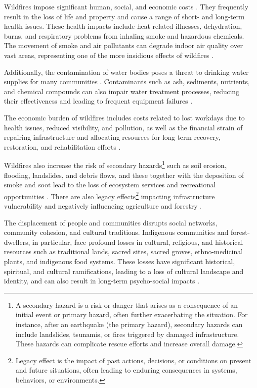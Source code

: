 \documentclass[
  12 pt,
]{Nemilov}
\begin{document}
Wildfires impose significant human, social, and economic costs \citep{bayham2022economics, paveglio2015understanding, thomas2017costs}. They frequently result in the loss of life and property and cause a range of short- and long-term health issues. These health impacts include heat-related illnesses, dehydration, burns, and respiratory problems from inhaling smoke and hazardous chemicals. The movement of smoke and air pollutants can degrade indoor air quality over vast areas, representing one of the more insidious effects of wildfires \citep{liang2021wildfire}.

Additionally, the contamination of water bodies poses a threat to drinking water supplies for many communities \citep{robinne2018spatial}. Contaminants such as ash, sediments, nutrients, and chemical compounds can also impair water treatment processes, reducing their effectiveness and leading to frequent equipment failures \citep{chen2020low, hohner2019wildfires}.

The economic burden of wildfires includes costs related to lost workdays due to health issues, reduced visibility, and pollution, as well as the financial strain of repairing infrastructure and allocating resources for long-term recovery, restoration, and rehabilitation efforts \citep{kim2019wildfire, mcconnell2021effects}.

Wildfires also increase the risk of secondary hazards\footnote{A secondary hazard is a risk or danger that arises as a consequence of an initial event or primary hazard, often further exacerbating the situation. For instance, after an earthquake (the primary hazard), secondary hazards can include landslides, tsunamis, or fires triggered by damaged infrastructure. These hazards can complicate rescue efforts and increase overall damage.} such as soil erosion, flooding, landslides, and debris flows, and these together with the deposition of smoke and soot lead to the loss of ecosystem services and recreational opportunities \citep{gellman2022wildfire}. There are also legacy effects\footnote{Legacy effect is the impact of past actions, decisions, or conditions on present and future situations, often leading to enduring consequences in systems, behaviors, or environments.} impacting infrastructure vulnerability and negatively influencing agriculture and forestry \citep{fraser2022wildfire}.

The displacement of people and communities disrupts social networks, community cohesion, and cultural traditions. Indigenous communities and forest-dwellers, in particular, face profound losses in cultural, religious, and historical resources such as traditional lands, sacred sites, sacred groves, ethno-medicinal plants, and indigenous food systems. These losses have significant historical, spiritual, and cultural ramifications, leading to a loss of cultural landscape and identity, and can also result in long-term psycho-social impacts \citep{eisenman2015ecosystems, mihalus2023wildfire}.
\end{document}
